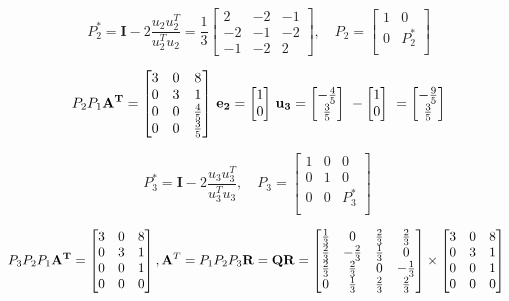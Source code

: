 \documentclass[english,onecolumn]{IEEEtran}
\def\Q{\mathbf{Q}}
\def\A{\mathbf{A}}
\def\R{\mathbf{R}}
\begin{document}
\begin{enumerate}
\[
	P_2^* = \textbf{I} - 2 \frac{u_2 u_2^T}{u_2^T u_2}
	=
	\frac{1}{3}\left[\begin{array}{ccc}
		2 & -2 & -1 \\
		-2 & -1 & -2 \\
		-1 & -2 & 2
	\end{array}\right], \quad
	P_2 = 
	\begin{bmatrix}
		1&0\\
		0&P_2^*\\
	\end{bmatrix}
	\]

	 \[
	{P_2 P_1\bf A^T}=
	\begin{bmatrix}
		3&0&8\\
		0&3&1\\
		0&0&\frac{4}{5}\\
		0&0&\frac{3}{5}
	\end{bmatrix}\,
	{\bf e_2}=
	\begin{bmatrix}
		1\\
		0
	\end{bmatrix}\,
	{\bf u_3}=
	\begin{bmatrix}
		-\frac{4}{5}\\
		\frac{3}{5}
	\end{bmatrix}\
	-
	\begin{bmatrix}
		1\\
		0
	\end{bmatrix}\
	=
	\begin{bmatrix}
		-\frac{9}{5}\\
		\frac{3}{5}
	\end{bmatrix}\]

\[
	P_3^* = \textbf{I} - 2 \frac{u_3 u_3^T}{u_3^T u_3}, \quad
	P_3 = 
	\begin{bmatrix}
		1&0&0\\
		0&1&0\\
		0&0&P_3^*\\
	\end{bmatrix}\
\]


 \[
{P_3 P_2 P_1\bf A^T}=
\begin{bmatrix}
	3&0&8\\
	0&3&1\\
	0&0&1\\
	0&0&0
\end{bmatrix},
\A^T=P_1 P_2 P_3 \R= \Q\R=
\begin{bmatrix}
	\frac{1}{3}&0&\frac{2}{3}&\frac{2}{3}\\
	\frac{2}{3}&-\frac{2}{3}&\frac{1}{3}&0\\
	\frac{2}{3}&\frac{2}{3}&0&-\frac{1}{3}\\
	0&\frac{1}{3}&\frac{2}{3}&\frac{2}{3}
\end{bmatrix} \times
\begin{bmatrix}
	3&0&8\\
	0&3&1\\
	0&0&1\\
	0&0&0
\end{bmatrix}\
\]


\end{enumerate}
\end{document}
